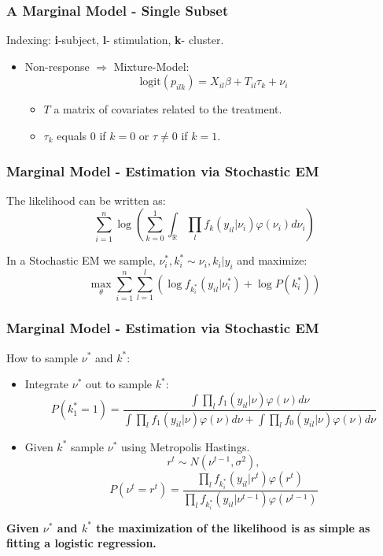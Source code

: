 \documentclass{beamer}
\theoremstyle{definition}
\begin{document}

\begin{frame}
\frametitle{A Marginal Model - Single Subset}
\begin{framed}
Indexing: \textbf{i}-subject, \textbf{l}- stimulation, \textbf{k}- cluster.
\end{framed}

\begin{itemize}
\item Non-response $\Rightarrow$ Mixture-Model:
$$
\text{logit}(p_{ilk}) = X_{il} \beta + T_{il}\tau_{k} + \nu_i
$$
	\begin{itemize}
	\item $T$ a matrix of covariates related to the treatment.
	\item $\tau_k$ equals $0$ if $k=0$ or $\tau\neq0$ if $k = 1$.
	\end{itemize}
\end{itemize}
\end{frame}



\begin{frame}
\frametitle{Marginal Model - Estimation via Stochastic EM}
The likelihood can be written as:
$$
\sum_{i=1}^{n}\log \left(\sum_{k=0}^{1}\int_{\mathbb{R}} \prod_{l} f_k(y_{il} | \nu_i)\varphi(\nu_i)d\nu_i\right)
$$
\pause
\vspace{0.5 cm}

In a Stochastic EM we sample, $\nu_i^*,k_i^* \sim \nu_i, k_i | y_{i}$ and maximize:
$$
\max_\theta\sum_{i=1}^{n} \sum_{l=1}^{l}\left(\log f_{k^*_i}(y_{il} | \nu^*_i) + \log P(k^*_i) \right)
$$
\end{frame}


\begin{frame}
\frametitle{Marginal Model - Estimation via Stochastic EM}
How to sample $\nu^*$ and $k^*$:
\begin{itemize}
\item Integrate $\nu^*$ out to sample $k^*$:
$$
P(k^*_1 = 1) = \frac{\int \prod_{l} f_1(y_{il} | \nu) \varphi(\nu)d\nu}{\int \prod_{l} f_1(y_{il} | \nu) \varphi(\nu)d\nu + \int \prod_{l} f_0(y_{il} | \nu) \varphi(\nu)d\nu}
$$

\pause
\vspace{0.3 cm}
\item Given $k^*$ sample $\nu^*$ using Metropolis Hastings.
$$
r^t \sim N(\nu^{t-1}, \sigma^{2}),
$$$$
P(\nu^{t} = r^t) = \frac{\prod_{l} f_{k^*_i}(y_{il} | r^{t}) \varphi(r^t)}
{\prod_{l} f_{k^*_i}(y_{il} | \nu^{t-1}) \varphi(\nu^{t-1})}
$$
\end{itemize}

\vspace{0.3 cm}
\pause
\textbf{Given $\nu^*$ and $k^*$ the maximization of the likelihood is as simple as fitting a logistic regression.}
\end{frame}
\end{document}
